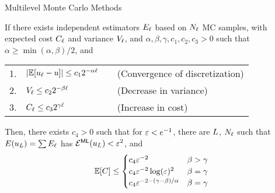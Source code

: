 \begin{frame}{Multilevel Monte Carlo Methods}
    \begin{theorem}[]
        If there exists independent estimators $E_\ell$ based on $N_\ell$ MC samples, with expected cost $C_\ell$ and variance $V_\ell$, and $\alpha, \beta, \gamma, c_1, c_2, c_3 > 0$ such that $\alpha \geq \min(\alpha, \beta)/2$, and
        \begin{center}
            \begin{tabular}{rlcl}
                1. & $|\mathbb{E}[u_\ell - u]| \leq c_1 2^{-\alpha\ell}$ & & (Convergence of discretization) \\
                2. & $V_\ell \leq c_2 2^{-\beta \ell}$ & & (Decrease in variance) \\
                3. & $C_\ell \leq c_3 2^{\gamma \ell}$ & & (Increase in cost)
            \end{tabular}
        \end{center}
        Then, there exists $c_4>0$ such that for $\varepsilon < e^{-1}$, there are $L$, $N_\ell$ such that $E(u_L) = \sum E_\ell$ has $\mathcal{E}^{\mathsf{ML}}(u_L) < \varepsilon^2$, and
        \begin{align*}
            \mathbb{E}[C] \leq
            \begin{cases}
                c_4 \varepsilon^{-2} & \beta > \gamma \\
                c_4 \varepsilon^{-2}\log(\varepsilon)^2 & \beta = \gamma \\
                c_4 \varepsilon^{-2 - (\gamma - \beta)/\alpha} & \beta = \gamma \\
            \end{cases}
        \end{align*}
    \end{theorem}
\end{frame}